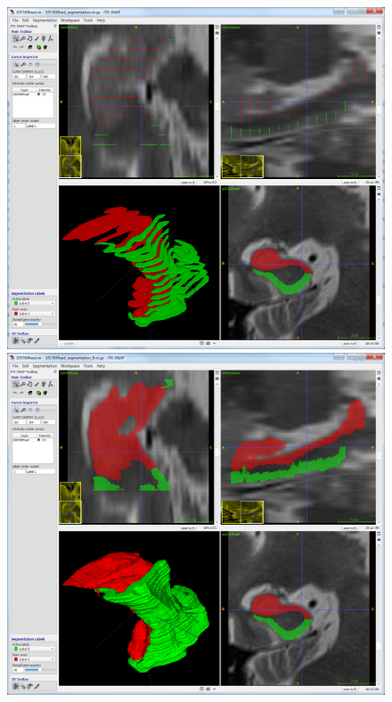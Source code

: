 \documentclass{InsightArticle}
\begin{document}
\begin{figure}[!htb]
\center
\includegraphics[scale=0.265]{In1.png}
\includegraphics[scale=0.265]{Out1.png}

\end{figure}
\end{document}
